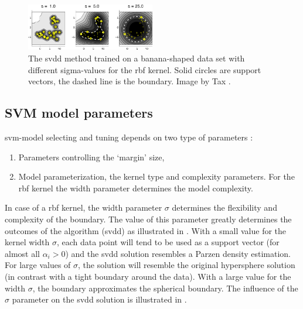 \begin{figure}
  \centering
    \includegraphics[width=0.5\textwidth,keepaspectratio]{./Figures/chapter3/svdd-boundary.pdf}
  \caption[SVDD boundary with sigma parameter]{The \gls{svdd} method trained on a banana-shaped data set with different sigma-values for the \gls{rbf} kernel. Solid circles are support vectors, the dashed line is the boundary. Image by Tax \cite{tax2001one}.}
  \label{fig:svdd-boundary}
\end{figure}


\subsection{SVM model parameters}\label{subsec:svm_model_parameters}
\gls{svm}-model selecting and tuning depends on two type of parameters \cite{cherkassky2007learning}:
\begin{enumerate}
  \item Parameters controlling the `margin' size,
  \item Model parameterization, \eg the kernel type and complexity parameters.
  For the \gls{rbf} kernel the width parameter determines the model complexity.
\end{enumerate}

In case of a \gls{rbf} kernel, the width parameter $\sigma$ determines the flexibility and complexity of the boundary.
The value of this parameter greatly determines the outcomes of the algorithm (\eg \gls{svdd}) as illustrated in .
With a small value for the kernel width $\sigma$, each data point will tend to be used as a support vector (for almost all $\alpha_i > 0$) and the \gls{svdd} solution resembles a Parzen density estimation.
For large values of $\sigma$, the solution will resemble the original hypersphere solution (in contrast with a tight boundary around the data).
With a large value for the width $\sigma$, the boundary approximates the spherical boundary.
The influence of the $\sigma$ parameter on the \gls{svdd} solution is illustrated in .

